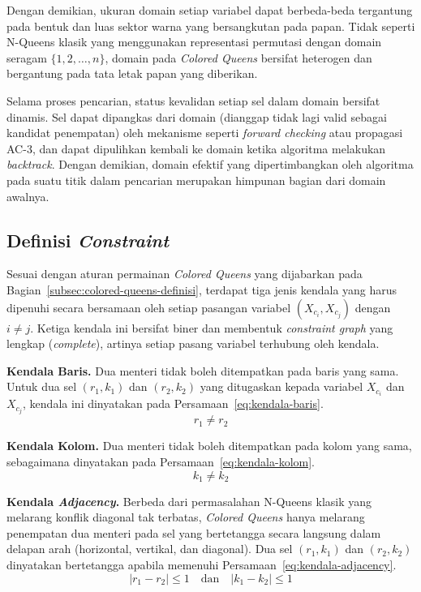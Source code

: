 Dengan demikian, ukuran domain setiap variabel dapat berbeda-beda tergantung pada bentuk dan luas sektor warna yang bersangkutan pada papan. Tidak seperti N-Queens klasik yang menggunakan representasi permutasi dengan domain seragam $\{1, 2, \dots, n\}$, domain pada \textit{Colored Queens} bersifat heterogen dan bergantung pada tata letak papan yang diberikan.

Selama proses pencarian, status kevalidan setiap sel dalam domain bersifat dinamis. Sel dapat dipangkas dari domain (dianggap tidak lagi valid sebagai kandidat penempatan) oleh mekanisme seperti \textit{forward checking} atau propagasi AC-3, dan dapat dipulihkan kembali ke domain ketika algoritma melakukan \textit{backtrack}. Dengan demikian, domain efektif yang dipertimbangkan oleh algoritma pada suatu titik dalam pencarian merupakan himpunan bagian dari domain awalnya.

\subsection{Definisi \textit{Constraint}}
\label{subsec:definisi-constraint}

Sesuai dengan aturan permainan \textit{Colored Queens} yang dijabarkan pada Bagian~\ref{subsec:colored-queens-definisi}, terdapat tiga jenis kendala yang harus dipenuhi secara bersamaan oleh setiap pasangan variabel $(X_{c_i}, X_{c_j})$ dengan $i \neq j$. Ketiga kendala ini bersifat biner dan membentuk \textit{constraint graph} yang lengkap (\textit{complete}), artinya setiap pasang variabel terhubung oleh kendala.

\textbf{Kendala Baris.} Dua menteri tidak boleh ditempatkan pada baris yang sama. Untuk dua sel $(r_1, k_1)$ dan $(r_2, k_2)$ yang ditugaskan kepada variabel $X_{c_i}$ dan $X_{c_j}$, kendala ini dinyatakan pada Persamaan~\ref{eq:kendala-baris}.
\begin{equation}
	r_1 \neq r_2
	\label{eq:kendala-baris}
\end{equation}

\textbf{Kendala Kolom.} Dua menteri tidak boleh ditempatkan pada kolom yang sama, sebagaimana dinyatakan pada Persamaan~\ref{eq:kendala-kolom}.
\begin{equation}
	k_1 \neq k_2
	\label{eq:kendala-kolom}
\end{equation}

\textbf{Kendala \textit{Adjacency}.} Berbeda dari permasalahan N-Queens klasik yang melarang konflik diagonal tak terbatas, \textit{Colored Queens} hanya melarang penempatan dua menteri pada sel yang bertetangga secara langsung dalam delapan arah (horizontal, vertikal, dan diagonal). Dua sel $(r_1, k_1)$ dan $(r_2, k_2)$ dinyatakan bertetangga apabila memenuhi Persamaan~\ref{eq:kendala-adjacency}.
\begin{equation}
	|r_1 - r_2| \leq 1 \quad \text{dan} \quad |k_1 - k_2| \leq 1
	\label{eq:kendala-adjacency}
\end{equation}

